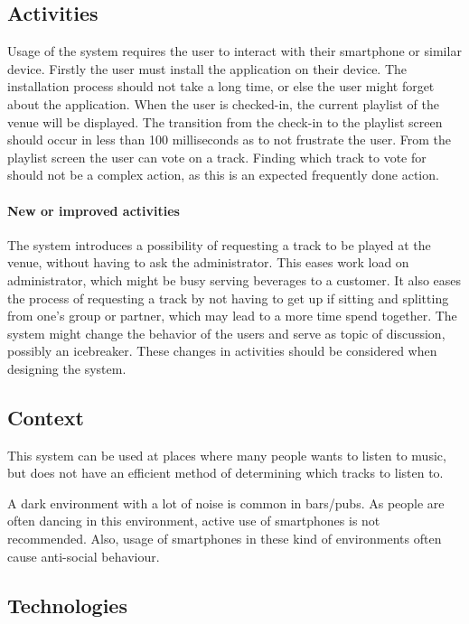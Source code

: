 \subsection{Activities}
\label{sub:pact_activities}

Usage of the system requires the user to interact with their smartphone or similar device. Firstly the user must install the application on their device. The installation process should not take a long time, or else the user might forget about the application. When the user is checked-in, the current playlist of the venue will be displayed. The transition from the check-in to the playlist screen should occur in less than 100 milliseconds as to not frustrate the user. From the playlist screen the user can vote on a track. Finding which track to vote for should not be a complex action, as this is an expected frequently done action.

\paragraph{New or improved activities}
The system introduces a possibility of requesting a track to be played at the venue, without having to ask the administrator. This eases work load on administrator, which might be busy serving beverages to a customer. It also eases the process of requesting a track by not having to get up if sitting and splitting from one's group or partner, which may lead to a more time spend together. The system might change the behavior of the users and serve as topic of discussion, possibly an icebreaker. These changes in activities should be considered when designing the system.

\subsection{Context}
\label{sub:pact_context}

This system can be used at places where many people wants to listen to music, but does not have an efficient method  of determining which tracks to listen to.

A dark environment with a lot of noise is common in bars/pubs. As people are often dancing in this environment, active use of smartphones is not recommended. Also, usage of smartphones in these kind of environments often cause anti-social behaviour. 

\subsection{Technologies}
\label{sub:pact_technologies}

